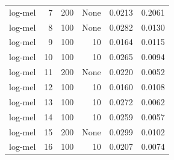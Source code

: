 \begin{longtable}{@{}lrrrrr@{}}
log-mel & 7 & 200 & None & 0.0213 & 0.2061 \\
log-mel & 8 & 100 & None & 0.0282 & 0.0130 \\
log-mel & 9 & 100 & 10 & 0.0164 & 0.0115 \\
log-mel & 10 & 100 & 10 & 0.0265 & 0.0094 \\
log-mel & 11 & 200 & None & 0.0220 & 0.0052 \\
log-mel & 12 & 100 & 10 & 0.0160 & 0.0108 \\
log-mel & 13 & 100 & 10 & 0.0272 & 0.0062 \\
log-mel & 14 & 100 & 10 & 0.0259 & 0.0057 \\
log-mel & 15 & 200 & None & 0.0299 & 0.0102 \\
log-mel & 16 & 100 & 10 & 0.0207 & 0.0074 \\
\bottomrule
\end{longtable}
